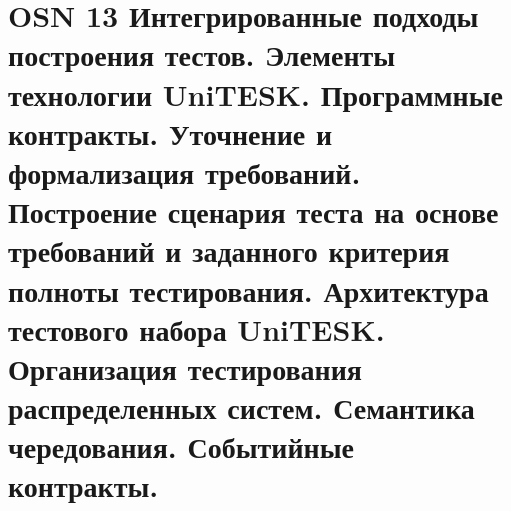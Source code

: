 \section*{OSN 13 Интегрированные подходы построения тестов. Элементы технологии UniTESK. Программные контракты. Уточнение и формализация требований. Построение сценария теста на основе требований и заданного критерия полноты тестирования. Архитектура тестового набора UniTESK. Организация тестирования распределенных систем. Семантика чередования. Событийные контракты.}

